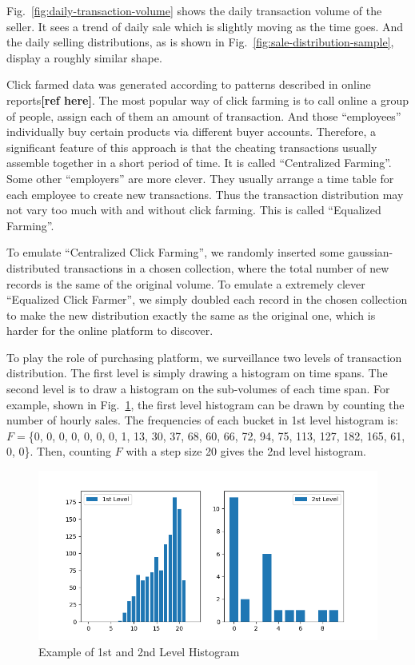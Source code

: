 \documentclass[a4paper]{IEEEtran}
\begin{document}
			Fig.~\ref{fig:daily-transaction-volume} shows the daily transaction volume of the seller. It sees a trend of daily sale which is slightly moving as the time goes. And the daily selling distributions, as is shown in Fig.~\ref{fig:sale-distribution-sample}, display a roughly similar shape.
			
			Click farmed data was generated according to patterns described in online reports\textbf{[ref here]}. The most popular way of click farming is to call online a group of people, assign each of them an amount of transaction. And those ``employees'' individually buy certain products via different buyer accounts. Therefore, a significant feature of this approach is that the cheating transactions usually assemble together in a short period of time. It is called ``Centralized Farming''. Some other ``employers'' are more clever. They usually arrange a time table for each employee to create new transactions. Thus the transaction distribution may not vary too much with and without click farming. This is called ``Equalized Farming''.
			
			To emulate ``Centralized Click Farming'', we randomly inserted some gaussian-distributed transactions in a chosen collection, where the total number of new records is the same of the original volume. To emulate a extremely clever ``Equalized Click Farmer'', we simply doubled each record in the chosen collection to make the new distribution exactly the same as the original one, which is harder for the online platform to discover.
			
			To play the role of purchasing platform, we surveillance two levels of transaction distribution. The first level is simply drawing a histogram on time spans. The second level is to draw a histogram on the sub-volumes of each time span. For example, shown in Fig.~\ref{fig:histogram-example}, the first level histogram can be drawn by counting the number of hourly sales. The frequencies of each bucket in 1st level histogram is: $F=$\{0, 0, 0, 0, 0, 0, 0, 1, 13, 30, 37, 68, 60, 66, 72, 94, 75, 113, 127, 182, 165, 61, 0, 0\}. Then, counting $F$ with a step size 20 gives the 2nd level histogram.
			
			\begin{figure}[!ht]
				\centering
				\includegraphics[width=\linewidth]{fig/HistogramExample.png}
				\caption{Example of 1st and 2nd Level Histogram}
				\label{fig:histogram-example}
			\end{figure}
			
\end{document}
